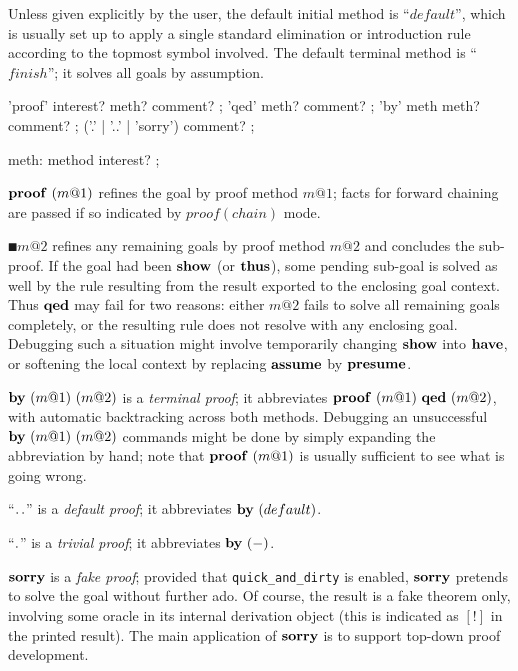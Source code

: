 \medskip

Unless given explicitly by the user, the default initial method is
``$default$'', which is usually set up to apply a single standard elimination
or introduction rule according to the topmost symbol involved.  The default
terminal method is ``$finish$''; it solves all goals by assumption.

\begin{rail}
  'proof' interest? meth? comment?
  ;
  'qed' meth? comment?
  ;
  'by' meth meth? comment?
  ;
  ('.' | '..' | 'sorry') comment?
  ;

  meth: method interest?
  ;
\end{rail}

\begin{descr}
\item [$\PROOF{m@1}$] refines the goal by proof method $m@1$; facts for
  forward chaining are passed if so indicated by $proof(chain)$ mode.
\item [$\QED{m@2}$] refines any remaining goals by proof method $m@2$ and
  concludes the sub-proof.  If the goal had been ${\mathord{\mathbf{show}}}$ (or ${\mathord{\mathbf{thus}}}$),
  some pending sub-goal is solved as well by the rule resulting from the
  result exported to the enclosing goal context.  Thus ${\mathord{\mathbf{qed}}}$ may fail for
  two reasons: either $m@2$ fails to solve all remaining goals completely, or
  the resulting rule does not resolve with any enclosing goal.  Debugging such
  a situation might involve temporarily changing ${\mathord{\mathbf{show}}}$ into ${\mathord{\mathbf{have}}}$,
  or softening the local context by replacing ${\mathord{\mathbf{assume}}}$ by ${\mathord{\mathbf{presume}}}$.
\item [$\BYY{m@1}{m@2}$] is a \emph{terminal proof}; it abbreviates
  $\PROOF{m@1}~\QED{m@2}$, with automatic backtracking across both methods.
  Debugging an unsuccessful $\BYY{m@1}{m@2}$ commands might be done by simply
  expanding the abbreviation by hand; note that $\PROOF{m@1}$ is usually
  sufficient to see what is going wrong.
\item [``${\mathord{\mathbf{.\,.}}}$''] is a \emph{default proof}; it abbreviates $\BY{default}$.
\item [``${\mathord{\mathbf{.}}}$''] is a \emph{trivial proof}; it abbreviates $\BY{-}$.
\item [${\mathord{\mathbf{sorry}}}$] is a \emph{fake proof}; provided that
  \texttt{quick_and_dirty} is enabled, ${\mathord{\mathbf{sorry}}}$ pretends to solve
  the goal without further ado.  Of course, the result is a fake theorem only,
  involving some oracle in its internal derivation object (this is indicated
  as $[!]$ in the printed result).  The main application of
  ${\mathord{\mathbf{sorry}}}$ is to support top-down proof development.
\end{descr}


